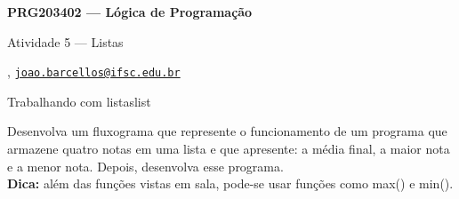





\begin{Large}
    \textbf{PRG203402 --- Lógica de Programação}
    
    Atividade 5 --- Listas \hfill {}
\end{Large}

\vspace{1ex}
\textbf{} , \href{mailto:joao.barcellos@ifsc.edu.br}{\texttt{joao.barcellos@ifsc.edu.br}}\\
\textbf{}


\vspace{2ex}

\begin{problem}{Trabalhando com listas}{list}

Desenvolva um fluxograma que represente o funcionamento de um programa que armazene quatro notas em uma lista e que apresente: a média final, a maior nota e a menor nota. Depois, desenvolva esse programa.\\
    
\textbf{Dica:} além das funções vistas em sala, pode-se usar funções como max() e min(). 

\end{problem}

\newpage

\printbibliography


